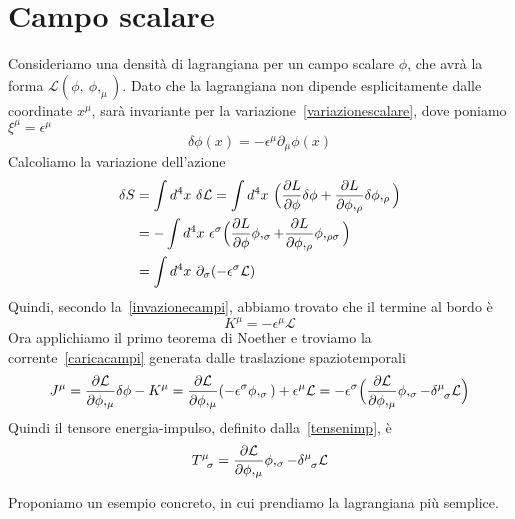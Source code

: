 \section{Campo scalare}
    Consideriamo una densità di lagrangiana per un campo scalare $\phi$, che avrà la forma $\mathcal L(\phi,~\phi,_\mu)$. Dato che la lagrangiana non dipende esplicitamente dalle coordinate $x^\mu$, sarà invariante per la variazione~\eqref{variazionescalare}, dove poniamo $\xi^\mu = \epsilon^\mu$
    \begin{equation}
        \delta \phi(x) = - \epsilon^\mu \partial_\mu \phi(x)
    \end{equation}
    Calcoliamo la variazione dell'azione
    \begin{equation*}
    \begin{aligned}
        \delta S & = \int d^4 x ~ \delta \mathcal L = \int d^4 x ~ \Big ( \frac{\partial L}{\partial\phi} \delta \phi + \frac{\partial L}{\partial\phi,_\rho} \delta \phi,_\rho \Big) \\ & = - \int d^4 x ~ \epsilon^\sigma \Big ( \frac{\partial L}{\partial\phi} \phi,_\sigma + \frac{\partial L}{\partial\phi,_\rho} \phi,_{\rho\sigma} \Big) \\ & = \int d^4 x ~ \partial_\sigma (- \epsilon^\sigma \mathcal L)
    \end{aligned}
    \end{equation*}
    Quindi, secondo la~\eqref{invazionecampi}, abbiamo trovato che il termine al bordo è
    \begin{equation*}
        K^\mu = - \epsilon^\mu \mathcal L
    \end{equation*}
    Ora applichiamo il primo teorema di Noether e troviamo la corrente~\eqref{caricacampi} generata dalle traslazione spaziotemporali
    \begin{equation*}
        J^\mu = \pdv{\mathcal L}{\phi,_\mu} \delta \phi - K^\mu = \pdv{\mathcal L}{\phi,_\mu} (- \epsilon^\sigma \phi,_\sigma) + \epsilon^\mu \mathcal L = - \epsilon^\sigma \Big ( \pdv{\mathcal L}{\phi,_\mu} \phi,_\sigma - \delta^\mu_{\phantom \mu \sigma} \mathcal L \Big)
    \end{equation*}
    Quindi il tensore energia-impulso, definito dalla~\eqref{tensenimp}, è
    \begin{equation}
        T^\mu_{\phantom \mu \sigma} = \pdv{\mathcal L}{\phi,_\mu} \phi,_\sigma - \delta^\mu_{\phantom \mu \sigma} \mathcal L
    \end{equation}

    \hfill

    Proponiamo un esempio concreto, in cui prendiamo la lagrangiana più semplice.

